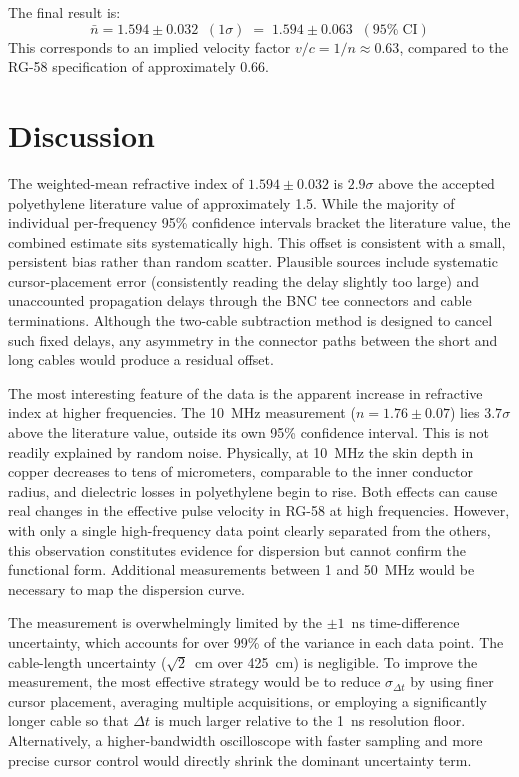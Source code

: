 \documentclass[12pt]{article}
\begin{document}
The final result is:
\begin{equation}
\boxed{\;\bar{n} = 1.594 \pm 0.032 \;\;(1\sigma) \;=\; 1.594 \pm 0.063 \;\;(95\%\;\text{CI})\;}
\label{eq:result}
\end{equation}
This corresponds to an implied velocity factor $v/c = 1/n \approx 0.63$, compared to the RG-58 specification of approximately 0.66.

\section{Discussion}

The weighted-mean refractive index of $1.594 \pm 0.032$ is $2.9\sigma$ above the accepted polyethylene literature value of approximately 1.5. While the majority of individual per-frequency 95\% confidence intervals bracket the literature value, the combined estimate sits systematically high. This offset is consistent with a small, persistent bias rather than random scatter. Plausible sources include systematic cursor-placement error (consistently reading the delay slightly too large) and unaccounted propagation delays through the BNC tee connectors and cable terminations. Although the two-cable subtraction method is designed to cancel such fixed delays, any asymmetry in the connector paths between the short and long cables would produce a residual offset.

The most interesting feature of the data is the apparent increase in refractive index at higher frequencies. The 10~MHz measurement ($n = 1.76 \pm 0.07$) lies $3.7\sigma$ above the literature value, outside its own 95\% confidence interval. This is not readily explained by random noise. Physically, at 10~MHz the skin depth in copper decreases to tens of micrometers, comparable to the inner conductor radius, and dielectric losses in polyethylene begin to rise. Both effects can cause real changes in the effective pulse velocity in RG-58 at high frequencies. However, with only a single high-frequency data point clearly separated from the others, this observation constitutes evidence for dispersion but cannot confirm the functional form. Additional measurements between 1 and 50~MHz would be necessary to map the dispersion curve.

The measurement is overwhelmingly limited by the $\pm 1$~ns time-difference uncertainty, which accounts for over 99\% of the variance in each data point. The cable-length uncertainty ($\sqrt{2}$~cm over 425~cm) is negligible. To improve the measurement, the most effective strategy would be to reduce $\sigma_{\Delta t}$ by using finer cursor placement, averaging multiple acquisitions, or employing a significantly longer cable so that $\Delta t$ is much larger relative to the 1~ns resolution floor. Alternatively, a higher-bandwidth oscilloscope with faster sampling and more precise cursor control would directly shrink the dominant uncertainty term.
\end{document}
